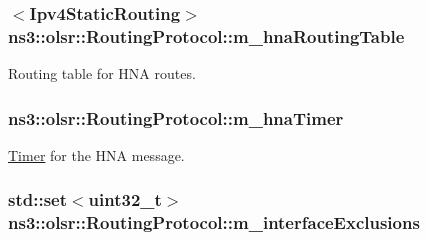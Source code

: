 \subsubsection[{\texorpdfstring{m\+\_\+hna\+Routing\+Table}{m_hnaRoutingTable}}]{$<${\bf Ipv4\+Static\+Routing}$>$ ns3\+::olsr\+::\+Routing\+Protocol\+::m\+\_\+hna\+Routing\+Table\hspace{0.3cm}{\ttfamily [private]}}\hypertarget{classns3_1_1olsr_1_1RoutingProtocol_a398799911ae136e0b247b4bbd608c336}{}\label{classns3_1_1olsr_1_1RoutingProtocol_a398799911ae136e0b247b4bbd608c336}


Routing table for H\+NA routes. 

\subsubsection[{\texorpdfstring{m\+\_\+hna\+Timer}{m_hnaTimer}}]{ ns3\+::olsr\+::\+Routing\+Protocol\+::m\+\_\+hna\+Timer\hspace{0.3cm}{\ttfamily [private]}}\hypertarget{classns3_1_1olsr_1_1RoutingProtocol_acaf11a25b83098c640a063a094148374}{}\label{classns3_1_1olsr_1_1RoutingProtocol_acaf11a25b83098c640a063a094148374}


\hyperlink{classns3_1_1Timer}{Timer} for the H\+NA message. 

\subsubsection[{\texorpdfstring{m\+\_\+interface\+Exclusions}{m_interfaceExclusions}}]{\setlength{\rightskip}{0pt plus 5cm}std\+::set$<$uint32\+\_\+t$>$ ns3\+::olsr\+::\+Routing\+Protocol\+::m\+\_\+interface\+Exclusions\hspace{0.3cm}{\ttfamily [private]}}\hypertarget{classns3_1_1olsr_1_1RoutingProtocol_afa7fdc171732e31fb92298d62f6340e6}{}\label{classns3_1_1olsr_1_1RoutingProtocol_afa7fdc171732e31fb92298d62f6340e6}


